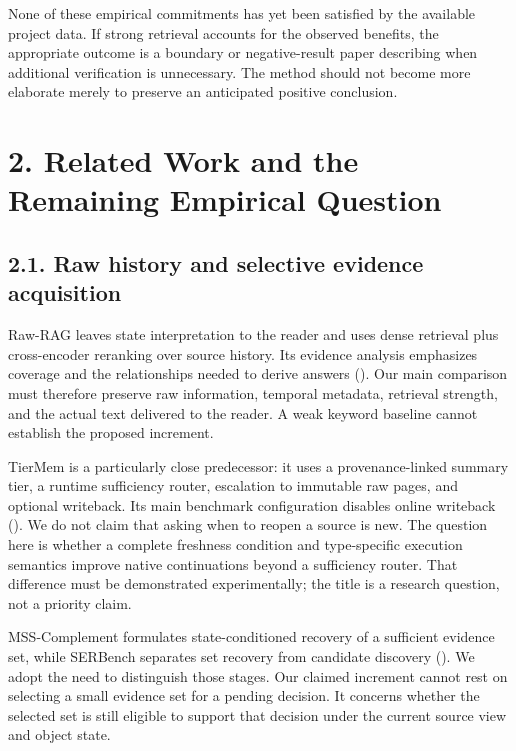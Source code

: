 \documentclass[
  11pt,
  a4paper,
]{article}
\begin{document}
None of these empirical commitments has yet been satisfied by the
available project data. If strong retrieval accounts for the observed
benefits, the appropriate outcome is a boundary or negative-result paper
describing when additional verification is unnecessary. The method
should not become more elaborate merely to preserve an anticipated
positive conclusion.

\section{2. Related Work and the Remaining Empirical
Question}\label{related-work-and-the-remaining-empirical-question}

\subsection{2.1. Raw history and selective evidence
acquisition}\label{raw-history-and-selective-evidence-acquisition}

Raw-RAG leaves state interpretation to the reader and uses dense
retrieval plus cross-encoder reranking over source history. Its evidence
analysis emphasizes coverage and the relationships needed to derive
answers (). Our main
comparison must therefore preserve raw information, temporal metadata,
retrieval strength, and the actual text delivered to the reader. A weak
keyword baseline cannot establish the proposed increment.

TierMem is a particularly close predecessor: it uses a provenance-linked
summary tier, a runtime sufficiency router, escalation to immutable raw
pages, and optional writeback. Its main benchmark configuration disables
online writeback (). We do
not claim that asking when to reopen a source is new. The question here
is whether a complete freshness condition and type-specific execution
semantics improve native continuations beyond a sufficiency router. That
difference must be demonstrated experimentally; the title is a research
question, not a priority claim.

MSS-Complement formulates state-conditioned recovery of a sufficient
evidence set, while SERBench separates set recovery from candidate
discovery ().
We adopt the need to distinguish those stages. Our claimed increment
cannot rest on selecting a small evidence set for a pending decision. It
concerns whether the selected set is still eligible to support that
decision under the current source view and object state.
\end{document}
